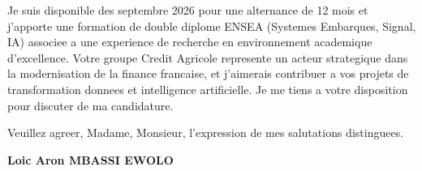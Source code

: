 \documentclass[a4paper,11pt]{article}
\begin{document}
Je suis disponible des septembre 2026 pour une alternance de 12 mois et j'apporte une formation de double diplome ENSEA (Systemes Embarques, Signal, IA) associee a une experience de recherche en environnement academique d'excellence. Votre groupe Credit Agricole represente un acteur strategique dans la modernisation de la finance francaise, et j'aimerais contribuer a vos projets de transformation donnees et intelligence artificielle. Je me tiens a votre disposition pour discuter de ma candidature.

\vspace{1.5em}
\noindent Veuillez agreer, Madame, Monsieur, l'expression de mes salutations distinguees.

\vspace{2em}
\noindent \textbf{Loic Aron MBASSI EWOLO}
\end{document}
